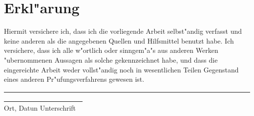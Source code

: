 
\section*{Erkl"arung}
{\large\textsf{Hiermit versichere ich, dass ich die vorliegende Arbeit 
   selbst"andig verfasst und keine anderen als die angegebenen Quellen und 
   Hilfsmittel benutzt habe. Ich versichere, dass ich alle w"ortlich oder 
   sinngem"a"s aus anderen Werken "ubernommenen Aussagen als solche gekennzeichnet
   habe, und dass die eingereichte Arbeit weder vollst"andig noch in wesentlichen
   Teilen Gegenstand eines anderen Pr"ufungsverfahrens gewesen ist.
   \vspace*{3em}\\
   \underline{\ \ \ \ \ \ \ \ \ \ \ \ \ \ \ \ \ \ \ \ \ \ \ \ \ \ \ \ \ \ \ \ \ 
              \ \ \ \ \ \ \ \ \ \ \ \ \ \ \ \ \ \ \ \ \ \ \ \ \ \ \ \ \ \ \ \ \ 
              \ \ \ \ \ \ \ \ \ \ \ \ \ \ \ \ \ \ \ \ \ \ \ \ \ \ \ \ \ }\\[1.0ex]
   Ort, Datun \hspace{5cm} Unterschrift}}
